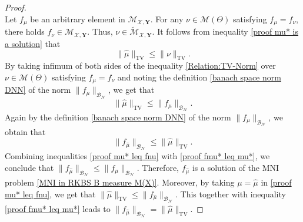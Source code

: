 \documentclass[11pt]{article}
\begin{document}
\begin{proof}
\begin{equation*}
    \end{equation*}
    Let $f_{\mu}$ be an arbitrary element in ${\mathcal{M}}_{\mathcal{X},\mathbf{Y}}$. For any $\nu\in\mathcal{M}(\Theta)$ satisfying $f_{\mu}=f_{\nu}$, there holds
    $f_{\nu}\in{\mathcal{M}}_{\mathcal{X},\mathbf{Y}}$. Thus,  $\nu\in\widetilde{\mathcal{M}}_{\mathcal{X},\mathbf{Y}}$. It follows from inequality \eqref{proof mu* is a solution} that
\begin{equation}\label{Relation:TV-Norm}
     \|{\hat{\mu}}\|_{\mathrm{TV}}\leq\|\nu\|_{\mathrm{TV}}. 
\end{equation}
By taking infimum of both sides of the inequality \eqref{Relation:TV-Norm} over $\nu\in\mathcal{M}(\Theta)$ satisfying $f_\mu=f_\nu$ and noting the definition \eqref{banach space norm DNN} of the  norm $\|f_\mu\|_{\mathcal{B}_{\mathcal{N}}}$, we get that  
\begin{equation}\label{proof mu* leq fnu}
        \|{\hat{\mu}}\|_{\mathrm{TV}}\leq\|f_\mu\|_{\mathcal{B}_{\mathcal{N}}}. 
\end{equation}
Again by the definition \eqref{banach space norm DNN} of the  norm $\|f_\mu\|_{\mathcal{B}_{\mathcal{N}}}$, we obtain that
\begin{equation}\label{proof fmu* leq mu*}    \|f_{{\hat{\mu}}}\|_{\mathcal{B}_{\mathcal{N}}}\leq\|{\hat{\mu}}\|_{\mathrm{TV}}.
\end{equation}
   Combining inequalities \eqref{proof mu* leq fnu} with \eqref{proof fmu* leq mu*}, we conclude that  $\|f_{{\hat{\mu}}}\|_{\mathcal{B}_{\mathcal{N}}}\leq\|f_{\mu}\|_{\mathcal{B}_{\mathcal{N}}}$. Therefore, $f_{{\hat{\mu}}}$ is a solution of the MNI problem \eqref{MNI in RKBS B measure M(X)}. %
   Moreover, by taking $\mu={\hat{\mu}}$ in \eqref{proof mu* leq fnu}, we get that $\|{\hat{\mu}}\|_{\mathrm{TV}}\leq\|f_{{\hat{\mu}}}\|_{\mathcal{B}_{\mathcal{N}}}$. This together with inequality \eqref{proof fmu* leq mu*} leads to $\|f_{{\hat{\mu}}}\|_{\mathcal{B}_{\mathcal{N}}}=\|{\hat{\mu}}\|_{\mathrm{TV}}$. 
\end{proof}



%
%
%
%
%
%
%
%
%
%
%
%
%
%
%
%
%
%
%
%
%
%
%
%
%
%
%
%
%
%
%
%
%
%




%
%
%
%
%
%
%
%
%
%
%
%
%
%
%
%
%
%
%

%
%
%
%
%
%
%

%
%
%
%
%
%
%
%
%
%
%
%
%
%
%
%
%
%
%
%
%
%
%
\end{document}
